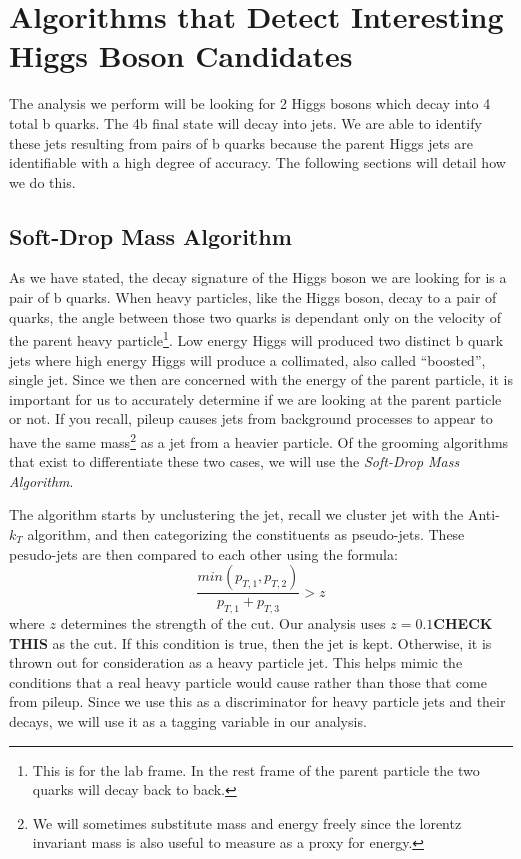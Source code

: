 \chapter{Algorithms that Detect Interesting Higgs Boson Candidates}
\label{chap:four}
The analysis we perform will be looking for 2 Higgs bosons which decay into 4 total b quarks.
The 4b final state will decay into jets. 
We are able to identify these jets resulting from pairs of b quarks because the parent Higgs jets are identifiable with a high degree of accuracy.
The following sections will detail how we do this.
\section{Soft-Drop Mass Algorithm}

As we have stated, the decay signature of the Higgs boson we are looking for is a pair of b quarks.
When heavy particles, like the Higgs boson, decay to a pair of quarks, the angle between those two quarks is dependant only on the velocity of the parent heavy particle\footnote{This is for the lab frame. In the rest frame of the parent particle the two quarks will decay back to back.}.
Low energy Higgs will produced two distinct b quark jets where high energy Higgs will produce a collimated, also called ``boosted'', single jet.
Since we then are concerned with the energy of the parent particle, it is important for us to accurately determine if we are looking at the parent particle or not.
If you recall, pileup causes jets from background processes to appear to have the same mass\footnote{We will sometimes substitute mass and energy freely since the lorentz invariant mass is also useful to measure as a proxy for energy.} as a jet from a heavier particle.
Of the grooming algorithms that exist to differentiate these two cases, we will use the \textit{Soft-Drop Mass Algorithm}.

The algorithm starts by unclustering the jet, recall we cluster jet with the Anti-$k_T$ algorithm, and then categorizing the constituents as pseudo-jets.
These pesudo-jets are then compared to each other using the formula:
\begin{equation}
    \frac{min(p_{T,1},p_{T,2})}{p_{T,1}+p_{T,3}} > z
\end{equation}
where $z$ determines the strength of the cut. Our analysis uses $z = 0.1$\textbf{CHECK THIS} as the cut. 
If this condition is true, then the jet is kept. Otherwise, it is thrown out for consideration as a heavy particle jet.
This helps mimic the conditions that a real heavy particle would cause rather than those that come from pileup.
Since we use this as a discriminator for heavy particle jets and their decays, we will use it as a tagging variable in our analysis.

